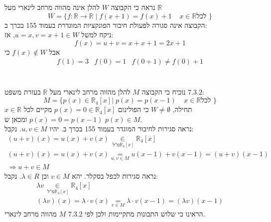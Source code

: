 \documentclass{article}
\newcommand\underrel[2]{\mathrel{\mathop{#2}\limits_{#1}}}
\begin{document}
נראה כי הקבוצה $W$ להלן אינה מהווה מרחב לינארי מעל $\mathbb{R}$
\[
    W=\{f: \mathbb{R} \rightarrow \mathbb{R} \; | \; f(x+1) = f(x)+1 \;\;\;\; x\in \mathbb{R} \text{לכל } \}
\]
הקבוצה אינה סגורה לפעולת חיבור הפונקציות המוגדרת בעמוד 155 בכרך ב: \\
ניקח למשל $u=x, v=x+1\in W$, אז:
\[
    f(x)=u+v=
    x+x+1=
    2x+1
\]
אבל $f(x)\notin W$
כי
\[
    \begin{matrix}
        f(1)=3 & f(0) = 1 & f(0+1)\ne f(0)+1
    \end{matrix}
\]
\\\\
נוכיח כי הקבוצה $M$ להלן מהווה מרחב לינארי מעל $\mathbb{R}$ בעזרת משפט $7.3.2$:
\[
    M=\{p(x)\in \mathbb{R}_4[x] | \; p(x) = p(x-1) \;\;\;\; x\in \mathbb{R} \text{לכל } \}
\]
תחילה, $W\ne \emptyset$
כי הפולינום $p(x)=0\in \mathbb{R}_4[x]$ מקיים לכל $x\in \mathbb{R}$ $p(x)=0=p(x-1)$ ומכאן ש $p(x)\in M$.\\
נראה סגירות לחיבור המוגדר בעמוד 155 בכרך ב. יהיו $u,v\in M$. נקבל:
\[
    \begin{matrix}
        (u + v)(x) = u(x)+v(x) \underrel{\text{ מ"ל} \mathbb{R}_4[x]}{\in} \mathbb{R}_4[x] \\
        (u+v)(x)=u(x)+v(x)\underrel{u,v\in M}{=} u(x-1)+v(x-1)=(u+v)(x-1)                  \\
        \Rightarrow u+v\in M
    \end{matrix}
\]
נראה סגירות לכפל בסקלר. יהא $v\in M$ וכן $\lambda \in R$. נקבל:
\[
    \begin{matrix}
        \lambda v \underrel{\text{ מ"ל} \mathbb{R}_4[x]}{\in} \mathbb{R}_4[x] \\
        (\lambda v)(x) = \lambda \cdot v(x) \underrel{v\in M}{=} \lambda \cdot v(x-1)= (\lambda v)(x-1)
    \end{matrix}
\]
הראינו כי שלוש התכונות מתקיימות ולכן לפי $7.3.2$ $M$ מהווה מרחב לינארי.
\end{document}

